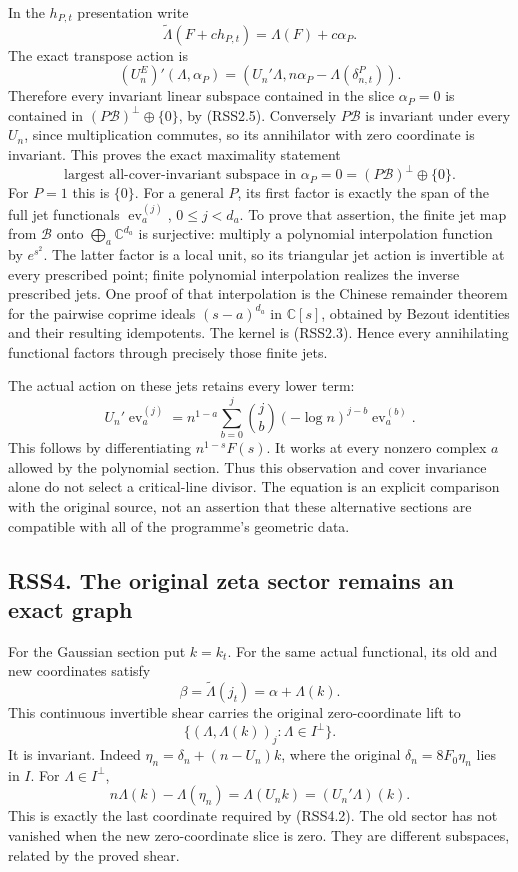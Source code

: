 In the \(h_{P,t}\) presentation write \[
\widetilde\Lambda(F+c h_{P,t})=\Lambda(F)+c\alpha_P.
\] The exact transpose action is \[
(U_n^E)'(\Lambda,\alpha_P)
=(U_n'\Lambda,n\alpha_P-\Lambda(\delta^P_{n,t})).
\tag{RSS3.1}
\] Therefore every invariant linear subspace contained in the slice
\(\alpha_P=0\) is contained in \((P\mathcal B)^\perp\oplus\{0\}\), by
(RSS2.5). Conversely \(P\mathcal B\) is invariant under every \(U_n\),
since multiplication commutes, so its annihilator with zero coordinate
is invariant. This proves the exact maximality statement \[
\boxed{\text{largest all-cover-invariant subspace in }\alpha_P=0
=(P\mathcal B)^\perp\oplus\{0\}.}
\tag{RSS3.2}
\] For \(P=1\) this is \(\{0\}\). For a general \(P\), its first factor
is exactly the span of the full jet functionals
\(\operatorname{ev}_a^{(j)}\), \(0\le j<d_a\). To prove that assertion,
the finite jet map from \(\mathcal B\) onto
\(\bigoplus_a\mathbb C^{d_a}\) is surjective: multiply a polynomial
interpolation function by \(e^{s^2}\). The latter factor is a local
unit, so its triangular jet action is invertible at every prescribed
point; finite polynomial interpolation realizes the inverse prescribed
jets. One proof of that interpolation is the Chinese remainder theorem
for the pairwise coprime ideals \((s-a)^{d_a}\) in \(\mathbb C[s]\),
obtained by Bezout identities and their resulting idempotents. The
kernel is (RSS2.3). Hence every annihilating functional factors through
precisely those finite jets.

The actual action on these jets retains every lower term: \[
U_n'\operatorname{ev}_a^{(j)}
=n^{1-a}\sum_{b=0}^j\binom jb(-\log n)^{j-b}\operatorname{ev}_a^{(b)}.
\tag{RSS3.3}
\] This follows by differentiating \(n^{1-s}F(s)\). It works at every
nonzero complex \(a\) allowed by the polynomial section. Thus this
observation and cover invariance alone do not select a critical-line
divisor. The equation is an explicit comparison with the original
source, not an assertion that these alternative sections are compatible
with all of the programme's geometric data.

\subsection{RSS4. The original zeta sector remains an exact
graph}\label{rss4.-the-original-zeta-sector-remains-an-exact-graph}

For the Gaussian section put \(k=k_t\). For the same actual functional,
its old and new coordinates satisfy \[
\beta=\widetilde\Lambda(j_t)=\alpha+\Lambda(k).
\tag{RSS4.1}
\] This continuous invertible shear carries the original zero-coordinate
lift to \[
\{(\Lambda,\Lambda(k))_j:\Lambda\in I^\perp\}.
\tag{RSS4.2}
\] It is invariant. Indeed \(\eta_n=\delta_n+(n-U_n)k\), where the
original \(\delta_n=8F_0\eta_n\) lies in \(I\). For
\(\Lambda\in I^\perp\), \[
n\Lambda(k)-\Lambda(\eta_n)=\Lambda(U_nk)=(U_n'\Lambda)(k).
\tag{RSS4.3}
\] This is exactly the last coordinate required by (RSS4.2). The old
sector has not vanished when the new zero-coordinate slice is zero. They
are different subspaces, related by the proved shear.

